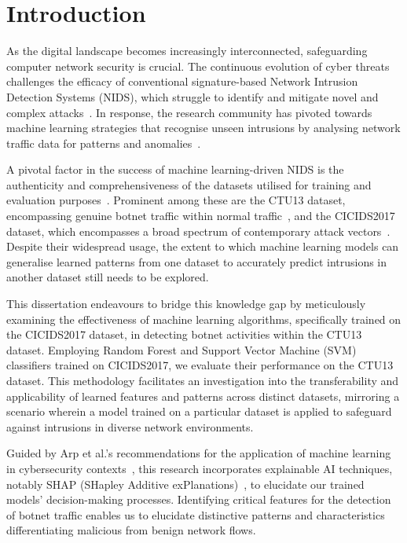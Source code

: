 \chapter{Introduction}\label{chap:introduction}

As the digital landscape becomes increasingly interconnected, safeguarding computer network security is crucial. The continuous evolution of cyber threats challenges the efficacy of conventional signature-based Network Intrusion Detection Systems (NIDS), which struggle to identify and mitigate novel and complex attacks~\cite{marchetti2016analysis}. In response, the research community has pivoted towards machine learning strategies that recognise unseen intrusions by analysing network traffic data for patterns and anomalies~\cite{buczak2015survey}.

A pivotal factor in the success of machine learning-driven NIDS is the authenticity and comprehensiveness of the datasets utilised for training and evaluation purposes~\cite{engelen2021troubleshooting}. Prominent among these are the CTU13 dataset, encompassing genuine botnet traffic within normal traffic~\cite{garcia2014empirical}, and the CICIDS2017 dataset, which encompasses a broad spectrum of contemporary attack vectors~\cite{sharafaldin2018toward}. Despite their widespread usage, the extent to which machine learning models can generalise learned patterns from one dataset to accurately predict intrusions in another dataset still needs to be explored.

This dissertation endeavours to bridge this knowledge gap by meticulously examining the effectiveness of machine learning algorithms, specifically trained on the CICIDS2017 dataset, in detecting botnet activities within the CTU13 dataset. Employing Random Forest and Support Vector Machine (SVM) classifiers trained on CICIDS2017, we evaluate their performance on the CTU13 dataset. This methodology facilitates an investigation into the transferability and applicability of learned features and patterns across distinct datasets, mirroring a scenario wherein a model trained on a particular dataset is applied to safeguard against intrusions in diverse network environments.

Guided by Arp et al.'s recommendations for the application of machine learning in cybersecurity contexts~\cite{arp2022and}, this research incorporates explainable AI techniques, notably SHAP (SHapley Additive exPlanations)~\cite{lundberg2017unified}, to elucidate our trained models' decision-making processes. Identifying critical features for the detection of botnet traffic enables us to elucidate distinctive patterns and characteristics differentiating malicious from benign network flows.

